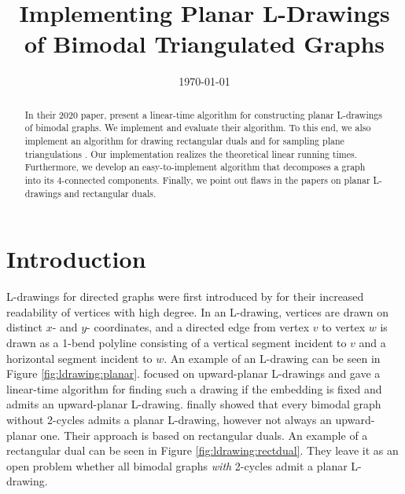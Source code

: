 \documentclass[a4paper]{article}
\title{Implementing Planar L-Drawings of Bimodal Triangulated Graphs}
\date{\today}
\begin{document}
\maketitle

\begin{abstract}
    In their 2020 paper, \citet{ldrawing} present a linear-time algorithm
    for constructing planar L-drawings of bimodal graphs.
    We implement and evaluate their algorithm.
    To this end, we also implement an algorithm for drawing rectangular duals
    \cite{dual} and for sampling plane triangulations \cite{sampling}.
    Our implementation realizes the theoretical linear running times.
    Furthermore, we develop an easy-to-implement algorithm that decomposes a
    graph into its 4-connected components.
    Finally, we point out flaws in the papers on planar L-drawings and
    rectangular duals.
\end{abstract}

\section{Introduction}
L-drawings for directed graphs were first introduced by \citet{ogldrawing} for
their increased readability of vertices with high degree.
In an L-drawing, vertices are drawn on distinct $x$- and $y$- coordinates, and a
directed edge from vertex $v$ to vertex $w$ is drawn as a 1-bend polyline
consisting of a vertical segment incident to $v$ and a horizontal segment
incident to $w$.
An example of an L-drawing can be seen in Figure \ref{fig:ldrawing:planar}.
\citet{npcomplete} focused on upward-planar L-drawings and gave a linear-time
algorithm for finding such a drawing if the embedding is fixed and admits an
upward-planar L-drawing.
\citet{ldrawing} finally showed that every bimodal graph without 2-cycles admits
a planar L-drawing, however not always an upward-planar one.
Their approach is based on rectangular duals.
An example of a rectangular dual can be seen in Figure
\ref{fig:ldrawing:rectdual}.
They leave it as an open problem whether all bimodal graphs \textit{with}
2-cycles admit a planar L-drawing.
\end{document}
